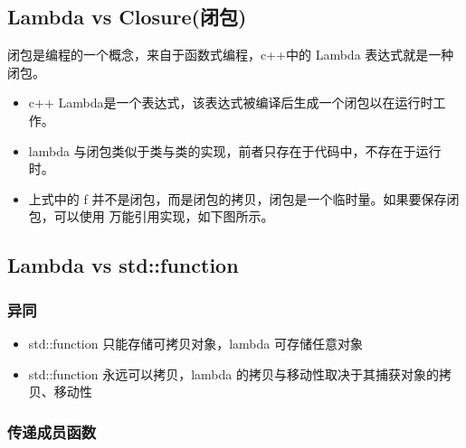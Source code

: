 \documentclass{article}
\begin{document}
\subsection{Lambda vs Closure(闭包)}

闭包是编程的一个概念，来自于函数式编程，c++中的 Lambda 表达式就是一种闭包。


\begin{itemize}
    \item c++ Lambda是一个表达式，该表达式被编译后生成一个闭包以在运行时工作。
    \item lambda 与闭包类似于类与类的实现，前者只存在于代码中，不存在于运行时。
    \item 上式中的 f 并不是闭包，而是闭包的拷贝，闭包是一个临时量。如果要保存闭包，可以使用
        万能引用实现，如下图所示。
\end{itemize}



\subsection{Lambda vs std::function}

\subsubsection{异同}
\begin{itemize}
    \item std::function 只能存储可拷贝对象，lambda 可存储任意对象
    \item std::function 永远可以拷贝，lambda 的拷贝与移动性取决于其捕获对象的拷贝、移动性
\end{itemize}

\subsubsection{传递成员函数}
\end{document}
